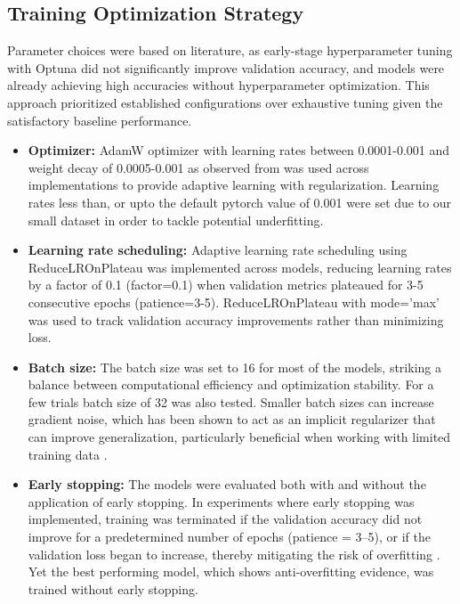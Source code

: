 \documentclass[a4paper,12pt]{report}
\begin{document}

\subsection{Training Optimization Strategy}
Parameter choices were based on literature, as early-stage hyperparameter tuning with Optuna did not significantly improve validation accuracy, and models were already achieving high accuracies without hyperparameter optimization. This approach prioritized established configurations over exhaustive tuning given the satisfactory baseline performance.

\begin{itemize}
    \item \textbf{Optimizer:} AdamW optimizer with learning rates between 0.0001-0.001 and weight decay of 0.0005-0.001 as observed from  was used across implementations to provide adaptive learning with regularization. Learning rates less than, or upto the default pytorch value of 0.001 were set due to our small dataset in order to tackle potential underfitting.
    
    \item \textbf{Learning rate scheduling:} Adaptive learning rate scheduling using ReduceLROnPlateau was implemented across models, reducing learning rates by a factor of 0.1 (factor=0.1) when validation metrics plateaued for 3-5 consecutive epochs (patience=3-5). ReduceLROnPlateau with mode='max' was used to track validation accuracy improvements rather than minimizing loss.
    
    \item \textbf{Batch size:} The batch size was set to 16 for most of the models, striking a balance between computational efficiency and optimization stability. For a few trials batch size of 32 was also tested. Smaller batch sizes can increase gradient noise, which has been shown to act as an implicit regularizer that can improve generalization, particularly beneficial when working with limited training data \citep{keskar2016largebatch, masters2018revisiting}.
    
    \item \textbf{Early stopping:} The models were evaluated both with and without the application of early stopping. In experiments where early stopping was implemented, training was terminated if the validation accuracy did not improve for a predetermined number of epochs (patience = 3–5), or if the validation loss began to increase, thereby mitigating the risk of overfitting \citep{Prechelt1998}. Yet the best performing model, which shows anti-overfitting evidence, was trained without early stopping.


\end{itemize}
\end{document}
